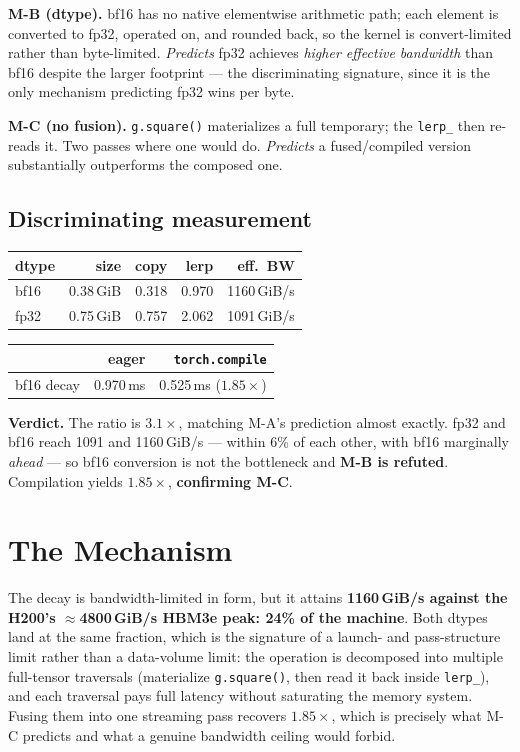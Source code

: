 \documentclass{article}
\begin{document}
\textbf{M-B (dtype).} bf16 has no native elementwise arithmetic path; each element is converted to fp32, operated on, and rounded back, so the kernel is convert-limited rather than byte-limited. \emph{Predicts} fp32 achieves \emph{higher effective bandwidth} than bf16 despite the larger footprint --- the discriminating signature, since it is the only mechanism predicting fp32 wins per byte.

\textbf{M-C (no fusion).} \texttt{g.square()} materializes a full temporary; the \texttt{lerp\_} then re-reads it. Two passes where one would do. \emph{Predicts} a fused/compiled version substantially outperforms the composed one.

\subsection{Discriminating measurement}
\begin{center}\begin{small}
\begin{tabular}{lrrrr}
\toprule
dtype & size & copy & lerp & eff.\ BW \\
\midrule
bf16 & 0.38\,GiB & 0.318 & 0.970 & 1160\,GiB/s \\
fp32 & 0.75\,GiB & 0.757 & 2.062 & 1091\,GiB/s \\
\bottomrule
\end{tabular}
\end{small}\end{center}
\begin{center}\begin{small}
\begin{tabular}{lrr}
\toprule
 & eager & \texttt{torch.compile} \\
\midrule
bf16 decay & 0.970\,ms & 0.525\,ms ($1.85\times$) \\
\bottomrule
\end{tabular}
\end{small}\end{center}

\textbf{Verdict.} The ratio is $3.1\times$, matching M-A's prediction almost exactly. fp32 and bf16 reach 1091 and 1160\,GiB/s --- within 6\% of each other, with bf16 marginally \emph{ahead} --- so bf16 conversion is not the bottleneck and \textbf{M-B is refuted}. Compilation yields $1.85\times$, \textbf{confirming M-C}.

\section{The Mechanism}
The decay is bandwidth-limited in form, but it attains \textbf{1160\,GiB/s against the H200's $\approx$4800\,GiB/s HBM3e peak: 24\% of the machine}. Both dtypes land at the same fraction, which is the signature of a launch- and pass-structure limit rather than a data-volume limit: the operation is decomposed into multiple full-tensor traversals (materialize \texttt{g.square()}, then read it back inside \texttt{lerp\_}), and each traversal pays full latency without saturating the memory system. Fusing them into one streaming pass recovers $1.85\times$, which is precisely what M-C predicts and what a genuine bandwidth ceiling would forbid.
\end{document}
